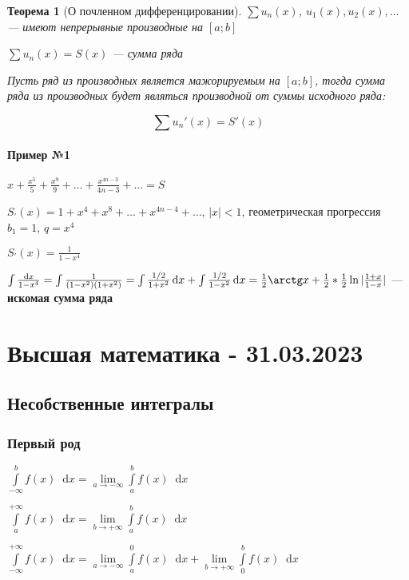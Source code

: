 \documentclass{article}
\newcommand*\diff{\mathop{}\!\mathrm{d}}
\newtheorem{theorem}{Теорема}
\begin{document}
\begin{theorem}[О почленном дифференцировании]

$\sum u_{n} (x)$, $u_1 (x), u_2(x), \dots$ — имеют непрерывные производные на $[a; b]$

$\sum u_n (x) = S(x)$ — сумма ряда

Пусть ряд из производных является мажорируемым на $[a; b]$, тогда сумма ряда из производных будет являться производной от суммы исходного ряда:

$$
\sum u_{n}'(x) = S'(x)
$$

\end{theorem}

\paragraph{Пример №1}

$x + \frac{x^{5}}{5} + \frac{x^{9}}{9} + \dots + \frac{x^{4 n - 3}}{4 n - 3} + \dots = S$

$S_{'}(x) = 1 + x^{4} + x^{8} + \dots + x^{4 n - 4} + \dots$, $|x| < 1$, геометрическая прогрессия $b_{1} = 1$, $q = x^4$

$S_{'}(x) = \frac{1}{1 - x^{4}}$

$\int \frac{\diff x}{1 - x^{4}} = \int \frac{1}{(1 - x^2) (1 + x^2)} = \int \frac{1 / 2}{1 + x^2} \diff x + \int \frac{1 / 2}{1 - x^2} \diff x = \frac{1}{2} \arctg x + \frac{1}{2} * \frac{1}{2} \ln | \frac{1 + x}{1 - x} |$ — \textbf{искомая сумма ряда}

\pagebreak
\section{Высшая математика - 31.03.2023}

\subsection{Несобственные интегралы}

\subsubsection{Первый род}

$\int\limits_{-\infty}^{b} f(x) \diff x = \lim\limits_{a \to -\infty} \int\limits_{a}^{b} f(x) \diff x$

$\int\limits_{a}^{+\infty} f(x) \diff x = \lim\limits_{b \to +\infty} \int\limits_{a}^{b} f(x) \diff x$

$\int\limits_{-\infty}^{+\infty} f(x) \diff x = \lim\limits_{a \to -\infty} \int\limits_{a}^{0} f(x) \diff x + \lim\limits_{b \to +\infty} \int\limits_{0}^{b} f(x) \diff x$
\end{document}
